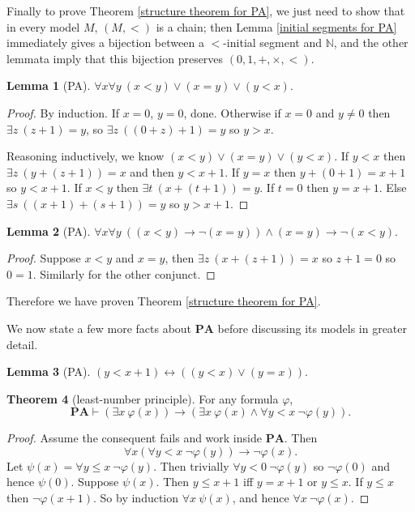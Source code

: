 \documentclass[12pt]{report}
\newcommand{\NN}{\mathbb{N}}
\renewcommand{\iff}{\leftrightarrow}
\newcommand{\PA}{\mathbf{PA}}
\newcommand{\proves}{\vdash}
\theoremstyle{definition}
\newtheorem{theorem}{Theorem}[chapter]
\newtheorem{lemma}[theorem]{Lemma}
\begin{document}
Finally to prove Theorem \ref{structure theorem for PA}, we just need to show that in every model $M$, $(M, <)$ is a chain; then Lemma \ref{initial segments for PA} immediately gives a bijection between a $<$-initial segment and $\NN$, and the other lemmata imply that this bijection preserves $(0, 1, +, \times, <)$.
\begin{lemma}[PA]
$\forall x \forall y ~(x < y) \vee (x = y) \vee (y < x)$.
\end{lemma}
\begin{proof}
By induction. If $x = 0$, $y = 0$, done.
Otherwise if $x = 0$ and $y \neq 0$ then $\exists z~(z+1)=y$, so $\exists z~((0+z)+1) = y$ so $y > x$.

Reasoning inductively, we know $(x < y) \vee (x = y) \vee (y < x)$.
If $y < x$ then $\exists z ~(y+(z+1)) = x$ and then $y < x + 1$.
If $y = x$ then $y + (0 + 1) = x + 1$ so $y < x + 1$.
If $x < y$ then $\exists t ~(x + (t+1))=y$. If $t = 0$ then $y = x + 1$. Else $\exists s ~((x+ 1) + (s+1))=y$ so $y > x + 1$.
\end{proof}
\begin{lemma}[PA]
$\forall x \forall y ~((x < y) \to \neg(x=y)) \wedge (x=y)\to\neg(x < y)$.
\end{lemma}
\begin{proof}
Suppose $x < y$ and $x = y$, then $\exists z~(x+(z+1)) = x$ so $z + 1 = 0$ so $0 = 1$. Similarly for the other conjunct.
\end{proof}
Therefore we have proven Theorem \ref{structure theorem for PA}.

We now state a few more facts about $\PA$ before discussing its models in greater detail.
\begin{lemma}[PA]
$(y < x + 1) \iff ((y < x) \vee (y = x))$.
\end{lemma}
\begin{theorem}[least-number principle]
For any formula $\varphi$,
$$\PA \proves (\exists x~\varphi(x)) \to (\exists x ~\varphi(x) \wedge \forall y < x ~\neg \varphi(y)).$$
\end{theorem}
\begin{proof}
Assume the consequent fails and work inside $\PA$. Then
$$\forall x(\forall y < x ~\neg \varphi(y)) \to \neg \varphi(x).$$
Let $\psi(x) = \forall y \leq x~\neg \varphi(y)$.
Then trivially $\forall y < 0 ~\neg \varphi(y)$ so $\neg \varphi(0)$ and hence $\psi(0)$.
Suppose $\psi(x)$. Then $y \leq x + 1$ iff $y = x + 1$ or $y \leq x$.
If $y \leq x$ then $\neg\varphi(x+1)$.
So by induction $\forall x ~\psi(x)$, and hence $\forall x~\neg\varphi(x)$.
\end{proof}
\end{document}
